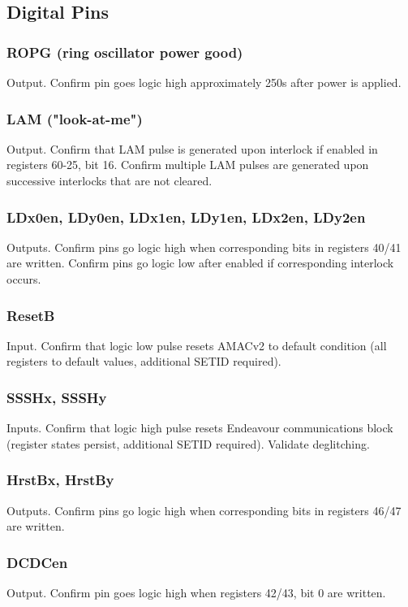 \documentclass[11pt]{article}   			%
\begin{document}
\subsection{Digital Pins}
\subsubsection{ROPG (ring oscillator power good)}
Output. Confirm pin goes logic high approximately 250\textmu s after power is applied.

\subsubsection{LAM ("look-at-me")}
Output. Confirm that LAM pulse is generated upon interlock if enabled in registers 60-25, bit 16. 
Confirm multiple LAM pulses are generated upon successive interlocks that are not cleared.

\subsubsection{LDx0en, LDy0en, LDx1en, LDy1en, LDx2en, LDy2en}
Outputs. Confirm pins go logic high when corresponding bits in registers 40/41 are 
written. Confirm pins go logic low after enabled if corresponding interlock occurs.

\subsubsection{ResetB}
Input. Confirm that logic low pulse resets AMACv2 to default condition (all registers to 
default values, additional SETID required).

\subsubsection{SSSHx, SSSHy}
Inputs. Confirm that logic high pulse resets Endeavour communications block (register states 
persist, additional SETID required). Validate deglitching.

\subsubsection{HrstBx, HrstBy}
Outputs. Confirm pins go logic high when corresponding bits in registers 46/47 are
written.

\subsubsection{DCDCen}
Output. Confirm pin goes logic high when registers 42/43, bit 0 are written.
\end{document}
